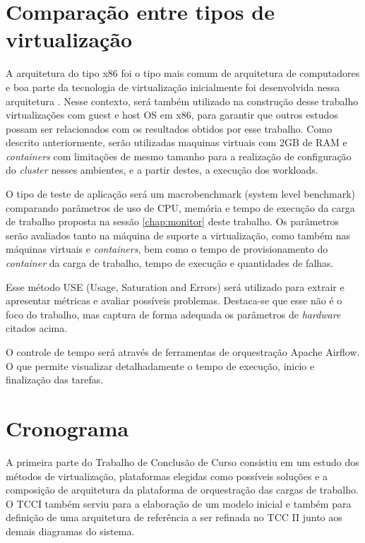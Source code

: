 \section{Comparação entre tipos de virtualização}

A arquitetura do tipo x86 foi o tipo mais comum de arquitetura de computadores e boa parte da tecnologia de virtualização inicialmente foi desenvolvida nessa arquitetura \cite{fayyad_benchmarking_2013}. Nesse contexto, será também utilizado na construção desse trabalho virtualizações com guest e host OS em x86, para garantir que outros estudos possam ser relacionados com os resultados obtidos por esse trabalho.
Como descrito anteriormente, serão utilizadas maquinas virtuais com 2GB de RAM e  \emph{containers} com limitações de mesmo tamanho para a realização de configuração do  \emph{cluster} nesses ambientes, e a partir destes, a execução dos workloads.

O tipo de teste de aplicação será um macrobenchmark (system level benchmark) \cite{huge2008,scheepers2014virtualization} comparando parâmetros de uso de CPU, memória e tempo de execução da carga de trabalho proposta na sessão \ref{chap:monitor} deste trabalho. Os parâmetros serão avaliados tanto na máquina de suporte a virtualização, como também nas máquinas virtuais e  \emph{containers}, bem como o tempo de provisionamento do  \emph{container} da carga de trabalho, tempo de execução e quantidades de falhas.

Esse método USE (Usage, Saturation and Errors) \cite{greg2022} será utilizado para extrair e apresentar métricas e avaliar possíveis problemas. Destaca-se que esse não é o foco do trabalho, mas captura de forma adequada os parâmetros de \emph{hardware} citados acima.

O controle de tempo será através de ferramentas de orquestração {Apache Airflow}\textregistered. O que permite visualizar detalhadamente o tempo de execução, inicio e finalização das tarefas.

\section{Cronograma}
A primeira parte do Trabalho de Conclusão de Curso consistiu em um estudo dos métodos de virtualização, plataformas elegidas como possíveis soluções e a composição de arquitetura da plataforma de orquestração das cargas de trabalho. O TCCI também serviu para a elaboração de um modelo inicial e também para definição de uma arquitetura de referência a ser refinada no TCC II junto aos demais diagramas do sistema.

